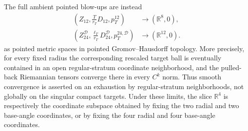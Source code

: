 \begin{theorem}
The full ambient pointed blow-ups are instead
\begin{align}
 \left(Z_{12},\frac{T}{r_T}D_{12},p_T^{12}\right)
 &\longrightarrow(\mathbb R^8,0),\\
 \left(Z_{24}^{\mathcal D},
       \frac{\ell_T}{r_T}D_{24}^{\mathcal D},
       p_T^{24,\mathcal D}\right)
 &\longrightarrow(\mathbb R^{12},0).
 \label{sphere-metric-ambient-fixed-blowups}
\end{align}
as pointed metric spaces in pointed Gromov--Hausdorff topology.  More
precisely, for every fixed radius the corresponding rescaled target ball is
eventually contained in an open regular-stratum coordinate neighborhood,
and the pulled-back Riemannian tensors converge there in every \(C^k\) norm.
Thus smooth convergence is asserted on an exhaustion by regular-stratum
neighborhoods, not globally on the singular compact targets.  Under these
limits, the slice \(\mathbb R^4\) is respectively the coordinate subspace
obtained by fixing the two radial and two base-angle coordinates, or by
fixing the four radial and four base-angle coordinates.
\end{theorem}


